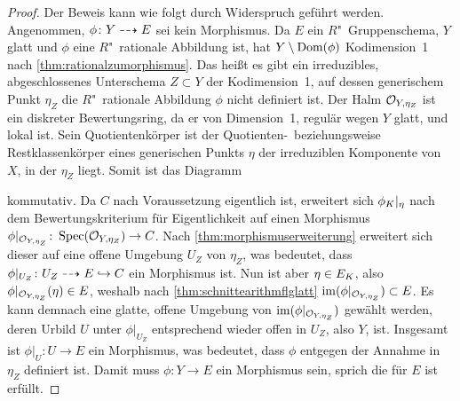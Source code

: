 \begin{Satz}
\begin{proof}
    Der Beweis kann wie folgt durch Widerspruch geführt werden.
    Angenommen, $\phi\colon Y\dashrightarrow E$ sei kein Morphismus.
    Da $E$ ein $R$"~Gruppenschema, $Y$ glatt und $\phi$ eine
    $R$"~rationale Abbildung ist, hat $Y\setminus\operatorname{Dom}(\phi)$
    Kodimension~1 nach \ref{thm:rationalzumorphismus}.
    Das heißt es gibt ein irreduzibles, abgeschlossenes Unterschema
    $Z\subset Y$ der Kodimension~1, auf dessen generischem Punkt
    $\eta_Z$ die $R$"~rationale Abbildung $\phi$ nicht definiert ist.
    Der Halm $\mathcal{O}_{Y,\eta_Z}$ ist ein diskreter Bewertungsring, da er
    von Dimension~1, regulär wegen $Y$ glatt, und lokal ist.
    Sein Quotientenkörper ist der Quotienten-~beziehungsweise
    Restklassenkörper eines generischen Punkts $\eta$ der irreduziblen
    Komponente von $X$, in der $\eta_Z$ liegt. Somit ist das Diagramm
    \begin{center}
    \end{center}
    kommutativ.
    Da $C$ nach Voraussetzung eigentlich ist, erweitert sich
    $\phi_{K}|_{\eta}$ nach dem Bewertungskriterium für
    Eigentlichkeit auf einen Morphismus
    ${\phi|_{\mathcal{O}_{Y,\eta_Z}}\colon\operatorname{Spec}(\mathcal{O}_{Y,\eta_Z})\to C}$.
    Nach \ref{thm:morphismuserweiterung} erweitert sich
    dieser auf eine offene Umgebung $U_Z$ von $\eta_Z$,
    was bedeutet, dass ${\phi|_{U_Z}\colon U_Z\dashrightarrow E\hookrightarrow C}$
    ein Morphismus ist.
    Nun ist aber ${\eta\in E_{K}}$, also
    ${\phi|_{\mathcal{O}_{Y,\eta_Z}}(\eta)\in E}$, weshalb nach
    \ref{thm:schnittearithmflglatt}
    ${\operatorname{im}(\phi|_{\mathcal{O}_{Y,\eta_Z}})\subset E}$.
    Es kann demnach eine glatte, offene Umgebung von
    $\operatorname{im}(\phi|_{\mathcal{O}_{Y,\eta_Z}})$ gewählt werden, deren Urbild $U$ unter
    $\phi|_{U_Z}$ entsprechend wieder offen in $U_Z$, also $Y$, ist.
    Insgesamt ist ${\phi|_U\colon U\to E}$ ein Morphismus, was
    bedeutet, dass $\phi$ entgegen der Annahme in $\eta_Z$ definiert
    ist.
    Damit muss ${\phi\colon Y\to E}$ ein Morphismus sein, sprich die
    \NAbbEig für $E$ ist erfüllt.
    

\end{proof}
\end{Satz}
